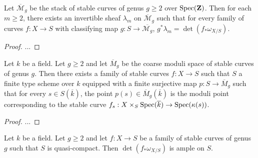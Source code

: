 \begin{lemma}
\label{lemma-mgbar-hodge-bundle}
Let $\overline{\mathcal{M}}_g$ be the stack of stable curves of genus $g \geq
2$ over $\mathop{\rm Spec}(\mathbf{Z})$.
Then for each $m \geq 2$, there exists an invertible sheaf $\lambda_m$ on
$\overline{\mathcal{M}}_g$ such that for every family of curves $f : X \to S$
with classifying map $g : S \to \overline{\mathcal{M}_g}$,
$g^*\lambda_m = \det(f_*\omega_{X/S})$.
\end{lemma}

\begin{proof}
...
\end{proof}

\begin{lemma}
\label{lemma-family-with-all-curves}
Let $k$ be a field.
Let $g \geq 2$ and let $\overline{M}_g$ be the coarse moduli space of stable
curves of genus $g$.
Then there exists a family of stable curves $f : X \to S$ such that
$S$ a finite type scheme over $k$ equipped with a finite surjective map
$p : S \to \overline{M}_g$ such that for every
$s \in S(\overline k)$, the point $p(s) \in \overline{M}_g(\overline k)$ is
the moduli point corresponding to the stable curve
$f_s : X \times_S \mathop{\rm Spec}(\overline k) \to \mathop{\rm Spec}(\kappa(s))$.
\end{lemma}

\begin{proof}
  ...
\end{proof}

\begin{lemma}
\label{lemma-ample-determinant-of-rel-canonical}
Let $k$ be a field.
Let $g \geq 2$ and let $f : X \to S$ be a family of stable curves of genus $g$
such that $S$ is quasi-compact.
Then $\det(f_*\omega_{X/S})$ is ample on $S$.
\end{lemma}

